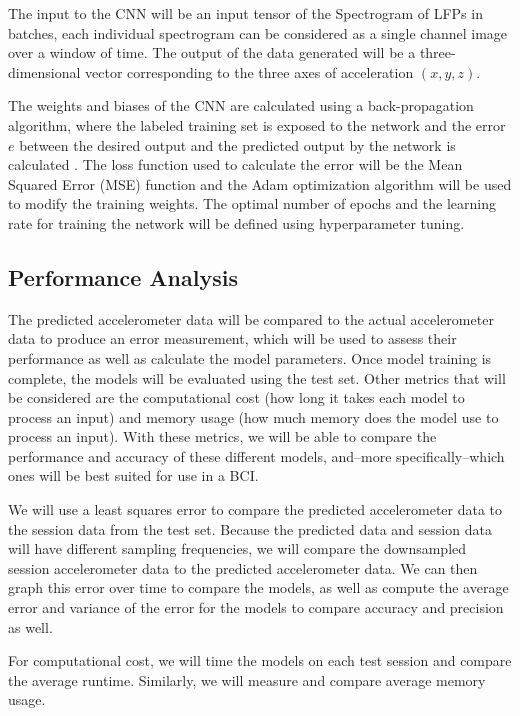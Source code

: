 \documentclass[12pt]{article}
\begin{document}
The input to the CNN will be an input tensor of the Spectrogram of LFPs in batches, each individual spectrogram can be considered as a single channel image over a window of time. The output of the data generated will be a three-dimensional vector corresponding to the three axes of acceleration $(x, y, z)$.

The weights and biases of the CNN are calculated using a back-propagation algorithm, where the labeled training set is exposed to the network and the error $e$ between the desired output and the predicted output by the network is calculated \cite{hecht1992}. The loss function used to calculate the error will be the Mean Squared Error (MSE) function and the Adam optimization algorithm will be used to modify the training weights. The optimal number of epochs and the learning rate for training the network will be defined using hyperparameter tuning.

\subsection{Performance Analysis}

The predicted accelerometer data will be compared to the actual accelerometer data to produce an error measurement, which will be used to assess their performance as well as calculate the model parameters. Once model training is complete, the models will be evaluated using the test set. Other metrics that will be considered are the computational cost (how long it takes each model to process an input) and memory usage (how much memory does the model use to process an input). With these metrics, we will be able to compare the performance and accuracy of these different models, and--more specifically--which ones will be best suited for use in a BCI.

We will use a least squares error to compare the predicted accelerometer data to the session data from the test set. Because the predicted data and session data will have different sampling frequencies, we will compare the downsampled session accelerometer data to the predicted accelerometer data. We can then graph this error over time to compare the models, as well as compute the average error and variance of the error for the models to compare accuracy and precision as well.

For computational cost, we will time the models on each test session and compare the average runtime. Similarly, we will measure and compare average memory usage.
\end{document}
